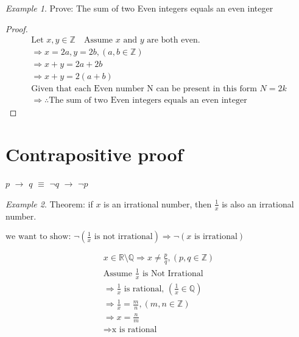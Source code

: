 \documentclass[11pt]{article}
\theoremstyle{remark}
\newtheorem*{example}{Example}
\newcommand{\Z}{\mathbb{Z}}
\begin{document}
	\begin{example}
		Prove: The sum of two Even integers equals an even integer\\
		\begin{proof}
			\begin{gather}
				\text{Let }x, y \in \mathbb{Z} \quad \text{Assume $x$ and $y$ are both even.} \\ 
				\Rightarrow x = 2a, y = 2b, (a, b \in \mathbb{Z})
				\\ \Rightarrow x + y = 2a + 2b \\ 
				\Rightarrow x + y = 2(a + b) \\
				\text{Given that each Even number N can be present in this form $N = 2k$}\\
				\Rightarrow \therefore \text{The sum of two Even integers equals an even integer}
			\end{gather}
		\end{proof}
	\end{example}
	
	\section{Contrapositive proof}
	\begin{center}
		$p$ $\rightarrow$ $q$ $\equiv$ $\neg q$  $\rightarrow$ $\neg p$\\
	\end{center}
	\begin{example}
		Theorem: if $x$ is an irrational number, then $\frac{1}{x}$ is also an irrational number.
	\end{example}
	$\text{we want to show: }\neg (\frac{1}{x} \text{ is not irrational}) \Rightarrow \neg (x \text{ is irrational}) $

	\begin{gather}
		x \in \mathbb{R} \setminus \mathbb{Q} \Rightarrow x \neq \frac{p}{q}, (p, q \in \mathbb{Z}) \\ 
		\text{Assume } \frac{1}{x} \text{ is Not Irrational}\\
		\Rightarrow \frac{1}{x} \text{ is rational, } (\frac{1}{x} \in \mathbb{Q})\\
		\Rightarrow \frac{1}{x} = \frac{m}{n}, (m, n \in \Z)\\
		\Rightarrow x = \frac{n}{m} \\
		\Rightarrow \text{x is rational}
	\end{gather}
\end{document}
